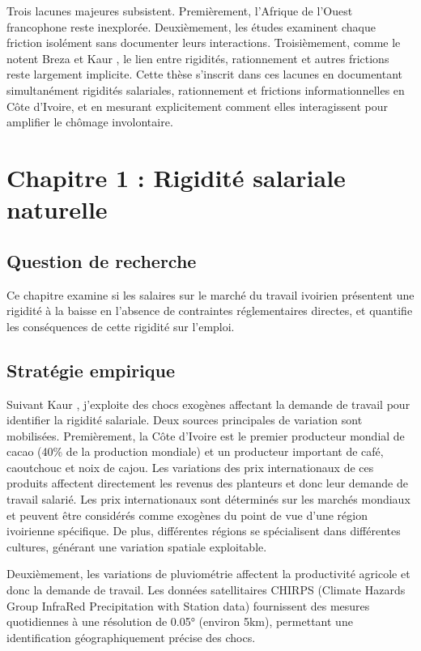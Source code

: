 \documentclass[12pt,a4paper]{article}
\begin{document}
Trois lacunes majeures subsistent. Premièrement, l'Afrique de l'Ouest francophone reste inexplorée. Deuxièmement, les études examinent chaque friction isolément sans documenter leurs interactions. Troisièmement, comme le notent Breza et Kaur \citeyearpar{breza2025}, le lien entre rigidités, rationnement et autres frictions reste largement implicite. Cette thèse s'inscrit dans ces lacunes en documentant simultanément rigidités salariales, rationnement et frictions informationnelles en Côte d'Ivoire, et en mesurant explicitement comment elles interagissent pour amplifier le chômage involontaire.

\section{Chapitre 1 : Rigidité salariale naturelle}

\subsection{Question de recherche}

Ce chapitre examine si les salaires sur le marché du travail ivoirien présentent une rigidité à la baisse en l'absence de contraintes réglementaires directes, et quantifie les conséquences de cette rigidité sur l'emploi.

\subsection{Stratégie empirique}

Suivant Kaur \citeyearpar{kaur2019}, j'exploite des chocs exogènes affectant la demande de travail pour identifier la rigidité salariale. Deux sources principales de variation sont mobilisées. Premièrement, la Côte d'Ivoire est le premier producteur mondial de cacao (40\% de la production mondiale) et un producteur important de café, caoutchouc et noix de cajou. Les variations des prix internationaux de ces produits affectent directement les revenus des planteurs et donc leur demande de travail salarié. Les prix internationaux sont déterminés sur les marchés mondiaux et peuvent être considérés comme exogènes du point de vue d'une région ivoirienne spécifique. De plus, différentes régions se spécialisent dans différentes cultures, générant une variation spatiale exploitable.

Deuxièmement, les variations de pluviométrie affectent la productivité agricole et donc la demande de travail. Les données satellitaires CHIRPS (Climate Hazards Group InfraRed Precipitation with Station data) fournissent des mesures quotidiennes à une résolution de 0.05° (environ 5km), permettant une identification géographiquement précise des chocs.
\end{document}
